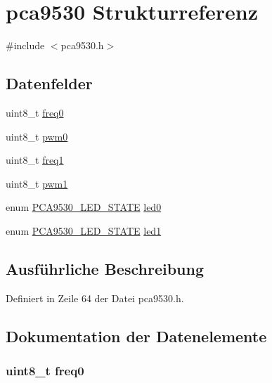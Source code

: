 \hypertarget{structpca9530}{}\section{pca9530 Strukturreferenz}
\label{structpca9530}


{\ttfamily \#include $<$pca9530.\+h$>$}

\subsection*{Datenfelder}
\begin{DoxyCompactItemize}
\item 
uint8\+\_\+t \hyperlink{structpca9530_a1a85040128a35d94e73a6d6b96aea658}{freq0}
\item 
uint8\+\_\+t \hyperlink{structpca9530_a2fb4d580ed22ad326b72701b98038bdc}{pwm0}
\item 
uint8\+\_\+t \hyperlink{structpca9530_a05652b55717263bec9a0d63ff6690969}{freq1}
\item 
uint8\+\_\+t \hyperlink{structpca9530_af1f85784c51fc6b57b6e713d160e6136}{pwm1}
\item 
enum \hyperlink{pca9530_8h_ace2d36a1fc0cc58626736636eaff2237}{P\+C\+A9530\+\_\+\+L\+E\+D\+\_\+\+S\+T\+A\+T\+E} \hyperlink{structpca9530_a3a42a3267d245b293db10c2cbb3330f9}{led0}
\item 
enum \hyperlink{pca9530_8h_ace2d36a1fc0cc58626736636eaff2237}{P\+C\+A9530\+\_\+\+L\+E\+D\+\_\+\+S\+T\+A\+T\+E} \hyperlink{structpca9530_a3ac265af8bbeb022cd8ad2f21247f6ac}{led1}
\end{DoxyCompactItemize}


\subsection{Ausführliche Beschreibung}


Definiert in Zeile 64 der Datei pca9530.\+h.



\subsection{Dokumentation der Datenelemente}
\hypertarget{structpca9530_a1a85040128a35d94e73a6d6b96aea658}{}
\subsubsection[{freq0}]{\setlength{\rightskip}{0pt plus 5cm}uint8\+\_\+t freq0}\label{structpca9530_a1a85040128a35d94e73a6d6b96aea658}


